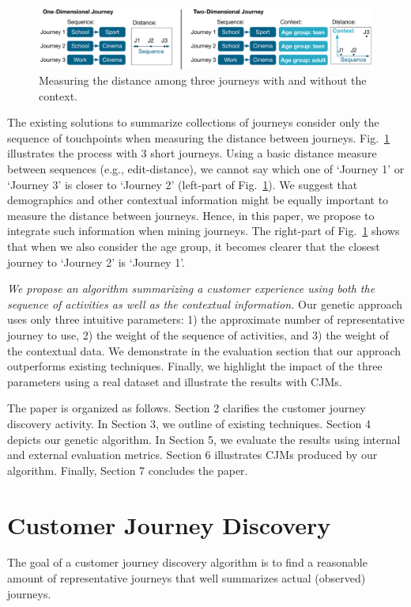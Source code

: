 \documentclass[runningheads]{llncs}
\begin{document}
\begin{figure}[H]
\centering
\includegraphics[width=1\columnwidth]{05_schema/context1.pdf}
\caption{Measuring the distance among three journeys with and without the context.}
\label{context1}
\end{figure}

The existing solutions to summarize collections of journeys \cite{gabadinho2009summarizing,bernard2019genetic} consider only the sequence of touchpoints when measuring the distance between journeys. Fig.~\ref{context1} illustrates the process with 3 short journeys. Using a basic distance measure between sequences (e.g., edit-distance), we cannot say which one of `Journey 1' or `Journey 3' is closer to `Journey 2' (left-part of Fig.~\ref{context1}). We suggest that demographics and other contextual information might be equally important to measure the distance between journeys. Hence, in this paper, we propose to integrate such information when mining journeys. The right-part of Fig.~\ref{context1} shows that when we also consider the age group, it becomes clearer that the closest journey to `Journey 2' is `Journey 1'.

{\it We propose an algorithm summarizing a customer experience using both the sequence of activities as well as the contextual information.} Our genetic approach uses only three intuitive parameters: 1) the approximate number of representative journey to use, 2) the weight of the sequence of activities, and 3) the weight of the contextual data. We demonstrate in the evaluation section that our approach outperforms existing techniques. Finally, we highlight the impact of the three parameters using a real dataset and illustrate the results with CJMs. 

The paper is organized as follows. Section 2 clarifies the customer journey discovery activity. In Section 3, we outline of existing techniques. Section 4 depicts our genetic algorithm. In Section 5, we evaluate the results using internal and external evaluation metrics. Section 6 illustrates CJMs produced by our algorithm. Finally, Section 7 concludes the paper. 


\section{Customer Journey Discovery}
The goal of a customer journey discovery algorithm is to find a reasonable amount of representative journeys that well summarizes actual (observed) journeys. 
\end{document}

